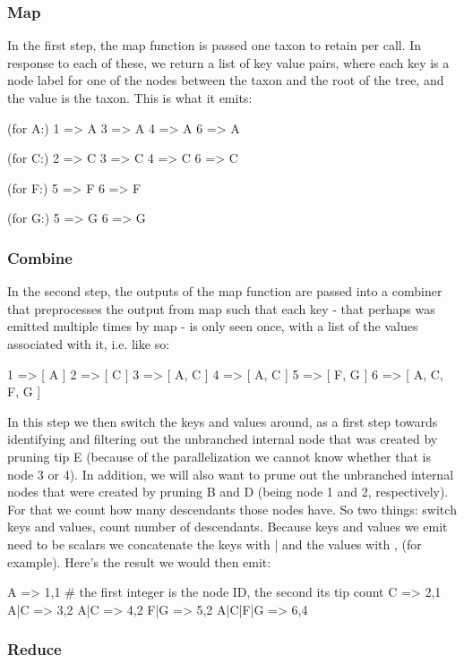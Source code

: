 \documentclass[10pt]{bmc_article}
\newenvironment{bmcformat}{\begin{raggedright}\baselineskip20pt\sloppy\setboolean{publ}{false}}{\end{raggedright}\baselineskip20pt\sloppy}
\begin{document}
\begin{bmcformat}
	\subsubsection*{Map}
		In the first step, the map function is passed one taxon to retain 
		per call. In response to each of these, we return a list of key value 
		pairs, where each key is a node label for one of the nodes between 
		the taxon and the root of the tree, and the value is the taxon. 
		This is what it emits:

		 (for A:)
		 1 => A
		 3 => A
		 4 => A
		 6 => A
		
		 (for C:)
		 2 => C
		 3 => C
		 4 => C
		 6 => C
		
		 (for F:)
		 5 => F
		 6 => F
		
		 (for G:)
		 5 => G
		 6 => G

	\subsubsection*{Combine}
		In the second step, the outputs of the map function are passed into 
		a combiner that preprocesses the output from map such that 
		each key - that perhaps was emitted multiple times by map - is only seen 
		once, with a list of the values associated with it, i.e. like so:

		 1 => [ A ]
		 2 => [ C ]
		 3 => [ A, C ]
		 4 => [ A, C ]
		 5 => [ F, G ]
		 6 => [ A, C, F, G ]

		In this step we then switch the keys and values around, as a first
		step towards identifying and filtering out the unbranched internal node 
		that was created by pruning tip E (because of the parallelization we 
		cannot know whether that is node 3 or 4). In addition, we will also 
		want to prune out the unbranched internal nodes that were created by 
		pruning B and D (being node 1 and 2, respectively). For that we count 
		how many descendants those nodes have. So two things: switch keys and 
		values, count number of descendants. Because keys and values we emit 
		need to be scalars we concatenate the keys with | and the values with , 
		(for example). Here's the result we would then emit:

		 A       => 1,1 # the first integer is the node ID, the second its tip count
		 C       => 2,1
		 A|C     => 3,2
		 A|C     => 4,2
		 F|G     => 5,2
		 A|C|F|G => 6,4

	\subsubsection*{Reduce}


\end{bmcformat}
\end{document}
